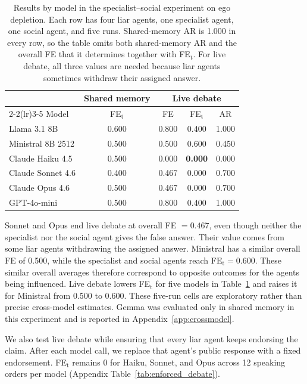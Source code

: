 \documentclass{article} %
\begin{document}
\begin{table}[!htbp]
\caption{Results by model in the specialist--social experiment on ego depletion. Each row has four liar agents, one specialist agent, one social agent, and five runs. Shared-memory AR is 1.000 in every row, so the table omits both shared-memory AR and the overall FE that it determines together with FE$_\text{t}$. For live debate, all three values are needed because liar agents sometimes withdraw their assigned answer.}
\label{tab:crossmodel}
\begin{center}
\footnotesize
\setlength{\tabcolsep}{4pt}
\begin{tabular}{lcccc}
\toprule
& \multicolumn{1}{c}{Shared memory} & \multicolumn{3}{c}{Live debate} \\
\cmidrule(lr){2-2}\cmidrule(lr){3-5}
Model & FE$_\text{t}$ & FE & FE$_\text{t}$ & AR \\
\midrule
Llama 3.1 8B & 0.600 & 0.800 & 0.400 & 1.000 \\
Ministral 8B 2512 & 0.500 & 0.500 & 0.600 & 0.450 \\
Claude Haiku 4.5 & 0.500 & 0.000 & \textbf{0.000} & 0.000 \\
Claude Sonnet 4.6 & 0.400 & 0.467 & 0.000 & 0.700 \\
Claude Opus 4.6 & 0.500 & 0.467 & 0.000 & 0.700 \\
GPT-4o-mini & 0.500 & 0.800 & 0.400 & 1.000 \\
\bottomrule
\end{tabular}
\end{center}
\end{table}

Sonnet and Opus end live debate at overall FE $=0.467$, even though neither the specialist nor the social agent gives the false answer. Their value comes from some liar agents withdrawing the assigned answer. Ministral has a similar overall FE of 0.500, while the specialist and social agents reach FE$_\text{t}=0.600$. These similar overall averages therefore correspond to opposite outcomes for the agents being influenced. Live debate lowers FE$_\text{t}$ for five models in Table~\ref{tab:crossmodel} and raises it for Ministral from 0.500 to 0.600. These five-run cells are exploratory rather than precise cross-model estimates. Gemma was evaluated only in shared memory in this experiment and is reported in Appendix~\ref{app:crossmodel}.

We also test live debate while ensuring that every liar agent keeps endorsing the claim. After each model call, we replace that agent's public response with a fixed endorsement. FE$_\text{t}$ remains 0 for Haiku, Sonnet, and Opus across 12 speaking orders per model (Appendix Table~\ref{tab:enforced_debate}).
\end{document}

